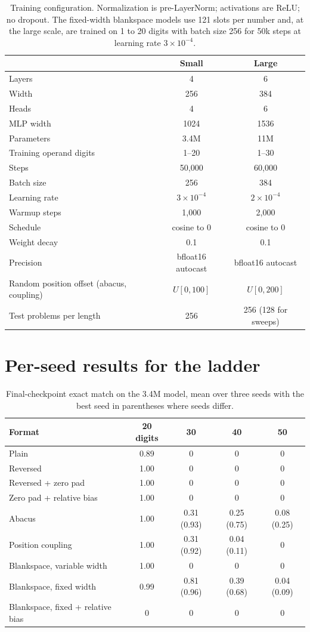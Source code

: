 \documentclass{article}
\begin{document}
\begin{table}[h]
\centering
\begin{tabular}{lcc}
\toprule
 & Small & Large \\
\midrule
Layers & 4 & 6 \\
Width & 256 & 384 \\
Heads & 4 & 6 \\
MLP width & 1024 & 1536 \\
Parameters & 3.4M & 11M \\
Training operand digits & 1--20 & 1--30 \\
Steps & 50,000 & 60,000 \\
Batch size & 256 & 384 \\
Learning rate & $3\times10^{-4}$ & $2\times10^{-4}$ \\
Warmup steps & 1,000 & 2,000 \\
Schedule & cosine to 0 & cosine to 0 \\
Weight decay & 0.1 & 0.1 \\
Precision & bfloat16 autocast & bfloat16 autocast \\
Random position offset (abacus, coupling) & $U[0, 100]$ & $U[0, 200]$ \\
Test problems per length & 256 & 256 (128 for sweeps) \\
\bottomrule
\end{tabular}
\caption{Training configuration. Normalization is pre-LayerNorm; activations are ReLU; no dropout. The fixed-width blankspace models use 121 slots per number and, at the large scale, are trained on 1 to 20 digits with batch size 256 for 50k steps at learning rate $3\times10^{-4}$.}
\end{table}

\section{Per-seed results for the ladder}

\begin{table}[h]
\centering
\begin{tabular}{lcccc}
\toprule
Format & 20 digits & 30 & 40 & 50 \\
\midrule
Plain & 0.89 & 0 & 0 & 0 \\
Reversed & 1.00 & 0 & 0 & 0 \\
Reversed + zero pad & 1.00 & 0 & 0 & 0 \\
Zero pad + relative bias & 1.00 & 0 & 0 & 0 \\
Abacus & 1.00 & 0.31 (0.93) & 0.25 (0.75) & 0.08 (0.25) \\
Position coupling & 1.00 & 0.31 (0.92) & 0.04 (0.11) & 0 \\
Blankspace, variable width & 1.00 & 0 & 0 & 0 \\
Blankspace, fixed width & 0.99 & 0.81 (0.96) & 0.39 (0.68) & 0.04 (0.09) \\
Blankspace, fixed + relative bias & 0 & 0 & 0 & 0 \\
\bottomrule
\end{tabular}
\caption{Final-checkpoint exact match on the 3.4M model, mean over three seeds with the best seed in parentheses where seeds differ.}
\end{table}
\end{document}
